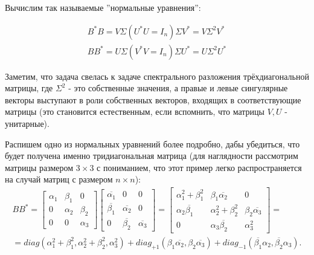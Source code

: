 Вычислим так называемые ''нормальные уравнения'':

\begin{equation} \label{Norm_eq}
    \begin{split}
        B^*B=V \Sigma (U^*U=I_n) \Sigma V^*=V \Sigma^2 V^*\\
        BB^*=U\Sigma (V^* V=I_n) \Sigma U^*=U \Sigma^2 U^*
    \end{split}
\end{equation}

Заметим, что задача свелась к задаче спектрального разложения трёхдиагональной матрицы, где $\Sigma^2$ - это собственные значения, а правые и левые сингулярные векторы выступают в роли собственных векторов, входящих в соответствующие матрицы (это становится естественным, если вспомнить, что матрицы \(V,U\) - унитарные). 

Распишем одно из нормальных уравнений более подробно, дабы убедиться, что будет получена именно тридиагональная матрица (для наглядности рассмотрим матрицы размером $3\times 3$ с пониманием, что этот пример легко распространяется на случай матриц с размером $n\times n$):
\begin{equation*}
    \begin{split}
        BB^*=\begin{bmatrix}
            \alpha_1 & \beta_1 & 0\\
            0 & \alpha_2 & \beta_2 \\
            0 & 0 & \alpha_3  
        \end{bmatrix}\begin{bmatrix}
            \overline{\alpha_1} & 0 & 0\\
            \overline{\beta_1} & \overline{\alpha_2} & 0 \\
            0 & \overline{\beta_2} & \overline{\alpha_3}  
        \end{bmatrix} =
        \begin{bmatrix}
            \alpha_1^2+\beta^2_1 & \beta_1 \overline{\alpha_2} & 0 \\
            \alpha_2 \overline{\beta_1} & \alpha_2^2+\beta_2^2 & \beta_2 \overline{\alpha_3} \\
            0 & \alpha_3 \overline{\beta_2} & \alpha_3^2
        \end{bmatrix} =\\[6pt]= diag(\alpha_1^2+\beta^2_1, \alpha_2^2+\beta^2_2,\alpha_3^2)+diag_{+1}(\beta_1 \overline{\alpha_2},\beta_2 \overline{\alpha_3})+diag_{-1}(\overline{\beta_1} \alpha_2,\overline{\beta_2} \alpha_3).
    \end{split}
\end{equation*}

